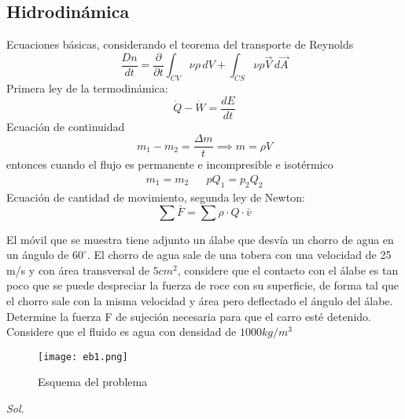 \subsection{Hidrodinámica}
Ecuaciones básicas, considerando el teorema del transporte de Reynolds
\begin{equation}
    \frac{Dn}{dt} = \frac{\partial }{\partial t} \int_{CV} \nu \rho \,dV + \int_{CS} \nu \rho \vec{V}\, d\vec{A}
\end{equation}
Primera ley de la termodinámica:
\begin{equation}
    \dot{Q} - \dot{W} = \frac{dE}{dt}
\end{equation}
Ecuación de continuidad
\begin{equation}
    m_1 - m_2 = \frac{\Delta m}{t}\implies m =\rho V
\end{equation}
entonces cuando el flujo es permanente e incompresible e isotérmico
\begin{align}
    m_1 = m_2&& pQ_1 = p_2Q_2
\end{align}
Ecuación de cantidad de movimiento, segunda ley de Newton:
\begin{equation}
    \sum \bar{F} = \sum \rho\cdot Q\cdot \bar{v}
\end{equation}
\begin{example}
    El móvil que se muestra tiene adjunto un álabe que desvía un chorro de agua en un ángulo de $60^{\circ}$. El chorro de agua sale de una tobera con una velocidad de 25 m/s y con área transversal de $5cm^2$, considere que el contacto con el álabe es tan poco que se puede despreciar la fuerza de roce con su superficie, de forma tal que el chorro sale con la misma velocidad y área pero deflectado el ángulo del álabe. Determine la fuerza F de sujeción necesaria para que el carro esté detenido. Considere que el fluido es agua con densidad de $1000kg/m^3$
\end{example}
\begin{figure}[h!]
\centering
  \texttt{[image: eb1.png]}
  \caption{Esquema del problema}
  \label{eb1}
\end{figure}
\textit{ Sol. }

